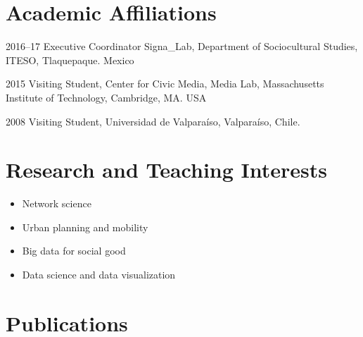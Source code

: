 \documentclass{academiccv}
\begin{document}
\section*{Academic Affiliations}

\begin{tablist}

\item[2016--17] \tab Executive Coordinator Signa\_Lab, Department of Sociocultural Studies, ITESO, Tlaquepaque. Mexico

\item[2015] \tab Visiting Student, Center for Civic Media,  Media Lab, Massachusetts Institute of Technology, Cambridge, MA. USA
\item[2008] \tab Visiting Student, Universidad de Valparaíso, Valparaíso, Chile.  

\end{tablist}



\section*{Research and Teaching Interests}

\begin{itemize}

\item Network science

\item Urban planning and mobility

\item Big data for social good

\item Data science and data visualization

\end{itemize}



\section*{Publications}



\end{document}
